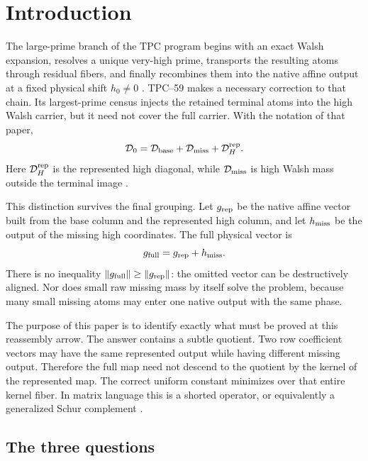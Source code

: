 \section{Introduction}
\label{sec:tpc60-introduction}

The large-prime branch of the TPC program begins with an exact Walsh
expansion, resolves a unique very-high prime, transports the resulting
atoms through residual fibers, and finally recombines them into the native
affine output at a fixed physical shift \(h_0\ne0\)
\citep{WangTPC45,WangTPC53,WangTPC57,WangTPC58}.  TPC--59 makes a necessary
correction to that chain.  Its largest-prime census injects the retained
terminal atoms into the high Walsh carrier, but it need not cover the full
carrier.  With the notation of that paper,
\begin{equation}
 \mathcal D_0
 =\mathcal D_{\rm base}+\mathcal D_{\rm miss}
  +\mathcal D_H^{\rm rep}.
 \label{eq:tpc60-inherited-three-part-diagonal}
\end{equation}
Here \(\mathcal D_H^{\rm rep}\) is the represented high diagonal, while
\(\mathcal D_{\rm miss}\) is high Walsh mass outside the terminal image
\citep{WangTPC59}.

This distinction survives the final grouping.  Let \(g_{\rm rep}\) be the
native affine vector built from the base column and the represented high
column, and let \(h_{\rm miss}\) be the output of the missing high
coordinates.  The full physical vector is
\begin{equation}
 g_{\rm full}=g_{\rm rep}+h_{\rm miss}.
 \label{eq:tpc60-full-sum-intro}
\end{equation}
There is no inequality
\(\|g_{\rm full}\|\ge\|g_{\rm rep}\|\): the omitted vector can be
destructively aligned.  Nor does small raw missing mass by itself solve the
problem, because many small missing atoms may enter one native output with
the same phase.

The purpose of this paper is to identify exactly what must be proved at
this reassembly arrow.  The answer contains a subtle quotient.  Two row
coefficient vectors may have the same represented output while having
different missing output.  Therefore the full map need not descend to the
quotient by the kernel of the represented map.  The correct uniform
constant minimizes over that entire kernel fiber.  In matrix language this
is a shorted operator, or equivalently a generalized Schur complement
\citep{AndersonTrapp1975,BenIsraelGreville2003}.

\subsection{The three questions}

